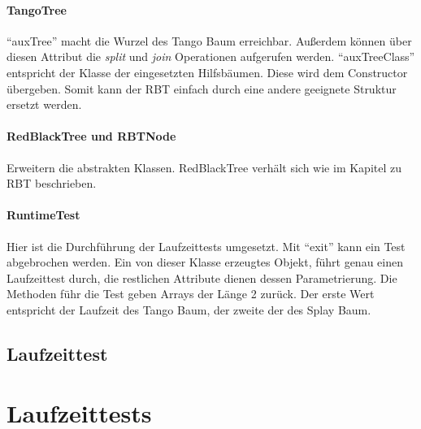 \documentclass[a4paper,12pt]{article}
\begin{document}
\paragraph{TangoTree}
\enquote{auxTree} macht die Wurzel des Tango Baum erreichbar. Außerdem können über diesen Attribut die \textit{split} und \textit{join} Operationen aufgerufen werden. \enquote{auxTreeClass} entspricht der Klasse der eingesetzten Hilfsbäumen. Diese wird dem Constructor übergeben. Somit kann der RBT einfach durch eine andere geeignete Struktur ersetzt werden.

\paragraph{RedBlackTree und RBTNode}
Erweitern die abstrakten Klassen. RedBlackTree verhält sich wie im Kapitel zu RBT beschrieben.

\paragraph{RuntimeTest}
Hier ist die Durchführung der Laufzeittests umgesetzt. Mit \enquote{exit} kann ein Test abgebrochen werden. Ein von dieser Klasse erzeugtes Objekt, führt genau einen Laufzeittest durch, die restlichen Attribute dienen dessen Parametrierung. Die Methoden führ die Test geben Arrays der Länge 2 zurück. Der erste Wert entspricht der Laufzeit des Tango Baum, der zweite der des Splay Baum.
\subsection{Laufzeittest}


\newpage


\section {Laufzeittests}





\newpage


\end{document}
